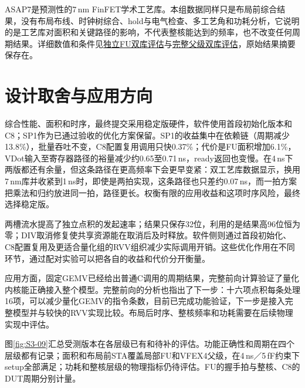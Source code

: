 ASAP7是预测性的7\,nm FinFET学术工艺库。本组数据同样只是布局前综合结果，没有布局布线、时钟树综合、hold与电气检查、多工艺角和功耗分析，它说明的是工艺库对面积和关键路径的影响，不代表整核能达到的频率，也不改变任何周期结果。详细数值和条件见\href{https://github.com/cc77-builder/riscv/blob/e2c2e8d5fa9a92c5d99c3c3e3f5399d60a115c63/team/optimizations/o4/asap7/RESULT.md}{独立FU双库评估}与\href{https://github.com/cc77-builder/riscv/blob/e2c2e8d5fa9a92c5d99c3c3e3f5399d60a115c63/team/optimizations/o4/asap7/PARENT_RESULT.md}{完整父级双库评估}，原始结果摘要保存在。
\FloatBarrier

\section{设计取舍与应用方向}
综合性能、面积和时序，最终提交采用稳定版硬件，软件使用首段初始化版本和C8；SP1作为已通过验收的优化方案保留。SP1的收益集中在依赖链（周期减少13.8\%），批量吞吐不变，C8配置复用调用只快0.37\%；代价是FU面积增加6.1\%，VDot输入至寄存器路径的裕量减少约0.65至0.71\,ns，ready返回也变慢。在4\,ns下两版都还有余量，但这条路径在更高频率下会更早变紧：双工艺库数据显示，换用7\,nm库并收紧到1\,ns时，即使是两拍实现，这条路径也只差约0.07\,ns，而一拍方案把乘法和归约放进同一拍，路径更长。权衡有限的应用收益和这项时序风险，最终选择稳定版。

两槽流水提高了独立点积的发起速率；结果只保存32位，利用的是结果高96位恒为零；DIV取消修复使共享资源能在取消后及时释放。软件侧则通过首段初始化、C8配置复用及更适合量化组的RVV组织减少实际调用开销。这些优化作用在不同环节，通过配对实验可以把各自的收益和代价分开衡量。

应用方面，固定GEMV已经给出普通C调用的周期结果，完整前向计算验证了量化内核能正确接入整个模型。完整前向的分析也指出了下一步：十六项点积每条处理16项，可以减少量化GEMV的指令条数，目前已完成功能验证，下一步是接入完整模型并与较快的RVV实现比较。布局后时序、整核频率和功耗需要在后续物理实现中评估。

图\ref{fig:S3-09}汇总受测版本在各层级已有和待补的评估。功能正确性和周期在四个层级都有记录；面积和布局前STA覆盖局部FU和VFEX4父级，在4\,ns／5\,fF约束下setup全部满足；功耗和整核层级的物理指标仍待评估。FU的握手拍与整核、C8的DUT周期分别计量。



